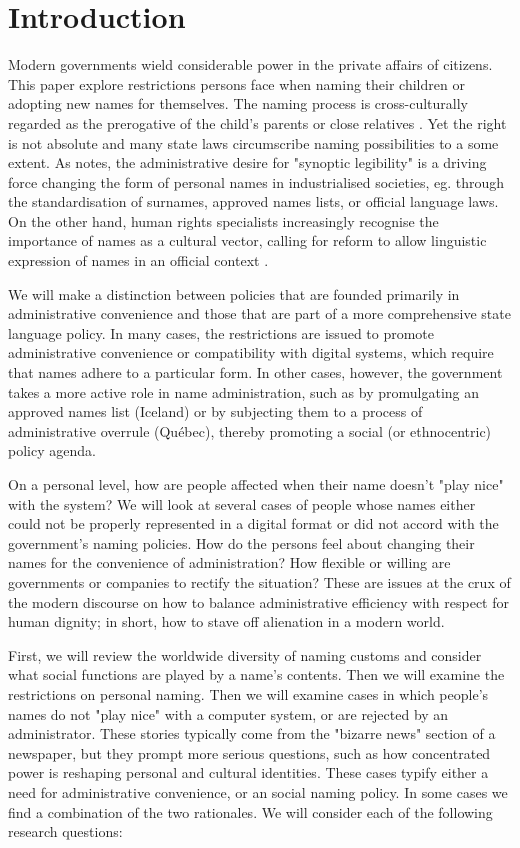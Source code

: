 \section{Introduction}

Modern governments wield considerable power in the private affairs of citizens.
This paper explore restrictions persons face when naming their children or
adopting new names for themselves. The naming process is cross-culturally
regarded as the prerogative of the child's parents or close relatives
\parencite{alford02}. Yet the right is not absolute and many state laws
circumscribe naming possibilities to a some extent. As \textcite{scott02} notes,
the administrative desire for "synoptic legibility" is a driving force changing
the form of personal names in industrialised societies, eg. through the
standardisation of surnames, approved names lists, or official language laws. On
the other hand, human rights specialists increasingly recognise the importance
of names as a cultural vector, calling for reform to allow linguistic expression
of names in an official context \parencite{varennes15}.

We will make a distinction between policies that are founded primarily in
administrative convenience and those that are part of a more comprehensive state
language policy. In many cases, the restrictions are issued to promote
administrative convenience or compatibility with digital systems, which require
that names adhere to a particular form. In other cases, however, the government
takes a more active role in name administration, such as by promulgating an
approved names list (Iceland) or by subjecting them to a process of
administrative overrule (Québec), thereby promoting a social (or ethnocentric)
policy agenda.

On a personal level, how are people affected when their name doesn't "play nice"
with the system? We will look at several cases of people whose names either
could not be properly represented in a digital format or did not accord with the
government's naming policies. How do the persons feel about changing their names
for the convenience of administration? How flexible or willing are governments
or companies to rectify the situation? These are issues at the crux of the
modern discourse on how to balance administrative efficiency with respect for
human dignity; in short, how to stave off alienation in a modern world.

First, we will review the worldwide diversity of naming customs and consider
what social functions are played by a name's contents. Then we will examine the
restrictions on personal naming. Then we will examine cases in which people's
names do not "play nice" with a computer system, or are rejected by an
administrator. These stories typically come from the "bizarre news" section of a
newspaper, but they prompt more serious questions, such as how concentrated
power is reshaping personal and cultural identities. These cases typify either a
need for administrative convenience, or an social naming policy. In some cases
we find a combination of the two rationales. We will consider each of the
following research questions:

